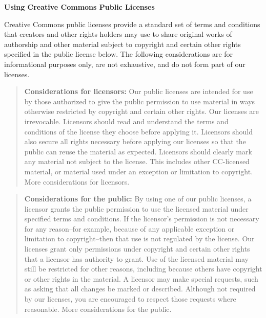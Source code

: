 \par \textbf{Using Creative Commons Public Licenses}
\par Creative Commons public licenses provide a standard set of terms and conditions that creators and other rights holders may use to share original works of authorship and other material subject to copyright and certain other rights specified in the public license below. The following considerations are for informational purposes only, are not exhaustive, and do not form part of our licenses.
\begin{quotation}\textbf{Considerations for licensors:} Our public licenses are intended for use by those authorized to give the public permission to use material in ways otherwise restricted by copyright and certain other rights. Our licenses are irrevocable. Licensors should read and understand the terms and conditions of the license they choose before applying it. Licensors should also secure all rights necessary before applying our licenses so that the public can reuse the material as expected. Licensors should clearly mark any material not subject to the license. This includes other CC-licensed material, or material used under an exception or limitation to copyright. More considerations for licensors.\end{quotation}
\begin{quotation}\textbf{Considerations for the public:} By using one of our public licenses, a licensor grants the public permission to use the licensed material under specified terms and conditions. If the licensor’s permission is not necessary for any reason–for example, because of any applicable exception or limitation to copyright–then that use is not regulated by the license. Our licenses grant only permissions under copyright and certain other rights that a licensor has authority to grant. Use of the licensed material may still be restricted for other reasons, including because others have copyright or other rights in the material. A licensor may make special requests, such as asking that all changes be marked or described. Although not required by our licenses, you are encouraged to respect those requests where reasonable.
More considerations for the public.\end{quotation}

